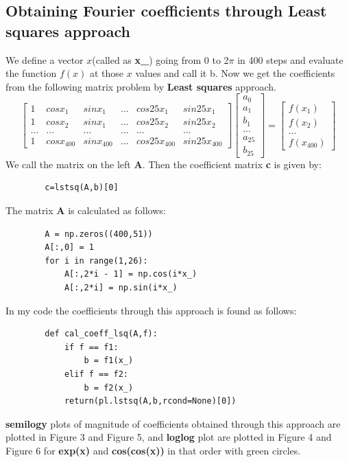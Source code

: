 \documentclass[11pt, a4paper]{article}
\begin{document}
    \subsection{Obtaining Fourier coefficients through Least squares approach}
    We define a vector $x$(called as \textbf{x\_}) going from 0 to 2$\pi$ in 400 steps and evaluate the function $f(x)$ at those $x$ values and call it b. Now we get the coefficients from the following matrix problem by \textbf{Least squares} approach.
    \[
    \begin{bmatrix}
        1 & cosx_1 & sinx_1 & ... & cos25x_1 & sin25x_1 \\
        1 & cosx_2 & sinx_1 & ... & cos25x_2 & sin25x_2 \\
        ... & ... & ... & ... & ... & ... \\
        1 & cosx_{400} & sinx_{400} & ... & cos25x_{400} & sin25x_{400}
    \end{bmatrix}
    \begin{bmatrix}
        a_0\\
        a_1\\
        b_1\\
        ...\\
        a_{25}\\
        b_{25}
    \end{bmatrix}
    =
    \begin{bmatrix}
        f(x_1)\\
        f(x_2)\\
        ...\\
        f(x_{400})
    \end{bmatrix}
    \]
    We call the matrix on the left \textbf{A}. Then the coefficient matrix \textbf{c} is given by:
    \begin{verbatim}
        c=lstsq(A,b)[0]
    \end{verbatim}
    
    The matrix \textbf{A} is calculated as follows:
    \begin{verbatim}
        A = np.zeros((400,51))
        A[:,0] = 1
        for i in range(1,26):
            A[:,2*i - 1] = np.cos(i*x_)
            A[:,2*i] = np.sin(i*x_)
    \end{verbatim}
    
    In my code the coefficients through this approach is found as follows:
    \begin{verbatim}
        def cal_coeff_lsq(A,f):
            if f == f1:
                b = f1(x_)
            elif f == f2:
                b = f2(x_)
            return(pl.lstsq(A,b,rcond=None)[0])
    \end{verbatim}
    \textbf{semilogy} plots of magnitude of coefficients obtained through this approach are plotted in Figure 3 and Figure 5, and \textbf{loglog} plot are plotted in Figure 4 and Figure 6 for \textbf{exp(x)} and \textbf{cos(cos(x))} in that order with green circles.
\end{document}
